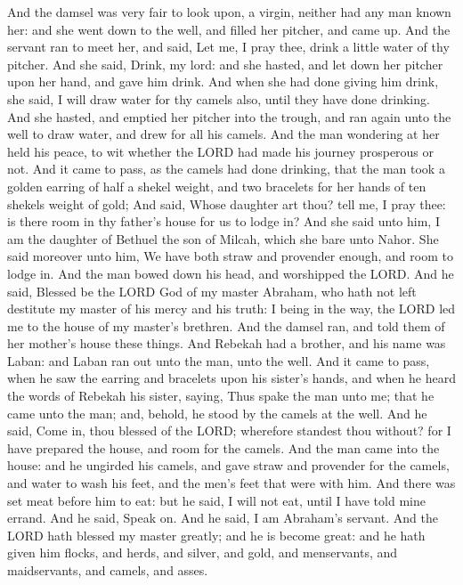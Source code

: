\begin{biblechapter}
\verse And the damsel was very fair to look upon, a virgin, neither had any man known her: and she went down to the well, and filled her pitcher, and came up.
\verse And the servant ran to meet her, and said, Let me, I pray thee, drink a little water of thy pitcher.
\verse And she said, Drink, my lord: and she hasted, and let down her pitcher upon her hand, and gave him drink.
\verse And when she had done giving him drink, she said, I will draw water for thy camels also, until they have done drinking.
\verse And she hasted, and emptied her pitcher into the trough, and ran again unto the well to draw water, and drew for all his camels.
\verse And the man wondering at her held his peace, to wit whether the LORD had made his journey prosperous or not.
\verse And it came to pass, as the camels had done drinking, that the man took a golden earring of half a shekel weight, and two bracelets for her hands of ten shekels weight of gold;
\verse And said, Whose daughter art thou? tell me, I pray thee: is there room in thy father's house for us to lodge in?
\verse And she said unto him, I am the daughter of Bethuel the son of Milcah, which she bare unto Nahor.
\verse She said moreover unto him, We have both straw and provender enough, and room to lodge in.
\verse And the man bowed down his head, and worshipped the LORD.
\verse And he said, Blessed be the LORD God of my master Abraham, who hath not left destitute my master of his mercy and his truth: I being in the way, the LORD led me to the house of my master's brethren.
\verse And the damsel ran, and told them of her mother's house these things.
\verse And Rebekah had a brother, and his name was Laban: and Laban ran out unto the man, unto the well.
\verse And it came to pass, when he saw the earring and bracelets upon his sister's hands, and when he heard the words of Rebekah his sister, saying, Thus spake the man unto me; that he came unto the man; and, behold, he stood by the camels at the well.
\verse And he said, Come in, thou blessed of the LORD; wherefore standest thou without? for I have prepared the house, and room for the camels.
\verse And the man came into the house: and he ungirded his camels, and gave straw and provender for the camels, and water to wash his feet, and the men's feet that were with him.
\verse And there was set meat before him to eat: but he said, I will not eat, until I have told mine errand. And he said, Speak on.
\verse And he said, I am Abraham's servant.
\verse And the LORD hath blessed my master greatly; and he is become great: and he hath given him flocks, and herds, and silver, and gold, and menservants, and maidservants, and camels, and asses.

\end{biblechapter}
